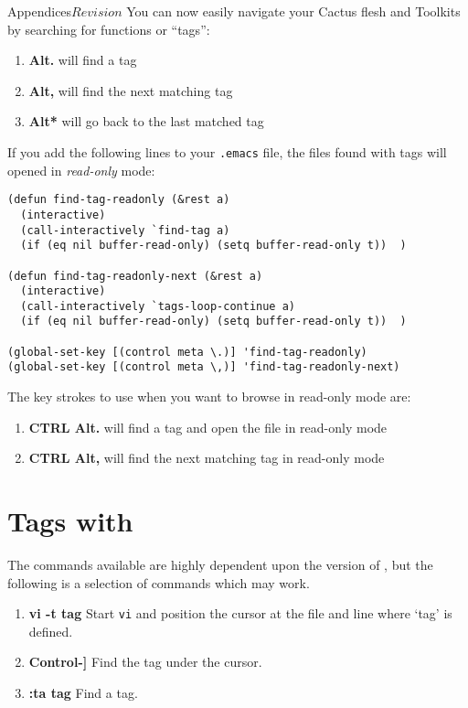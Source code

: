 \begin{cactuspart}{Appendices}{}{$Revision$}
You can now easily navigate your Cactus flesh and Toolkits by searching for
functions or ``tags'':
\begin{enumerate}
\item \textbf{ Alt.} will find a tag
\item \textbf{ Alt,} will find the next matching tag
\item \textbf{ Alt*} will go back to the last matched tag
\end{enumerate}
If you add the following lines to your {\tt .emacs} file, the
files found with tags will opened in \emph{read-only} mode:
\begin{verbatim}
(defun find-tag-readonly (&rest a)
  (interactive)
  (call-interactively `find-tag a)
  (if (eq nil buffer-read-only) (setq buffer-read-only t))  )

(defun find-tag-readonly-next (&rest a)
  (interactive)
  (call-interactively `tags-loop-continue a)
  (if (eq nil buffer-read-only) (setq buffer-read-only t))  )

(global-set-key [(control meta \.)] 'find-tag-readonly)
(global-set-key [(control meta \,)] 'find-tag-readonly-next)
\end{verbatim}
The key strokes to use when you want to browse in read-only mode are:
\begin{enumerate}
\item \textbf{CTRL Alt.} will find a tag and open the file in read-only mode
\item \textbf{CTRL Alt,} will find the next matching tag in read-only mode
\end{enumerate}

\section{Tags with }

The commands available are highly dependent upon the version of , but
the following is a selection of commands which may work.


\begin{enumerate}

\item \textbf{vi -t tag}
Start {\tt vi} and position the cursor at the file and line where `tag' is defined.

\item \textbf{Control-{]}}
Find the tag under the cursor.

\item \textbf{:ta tag}
Find a tag.


\end{enumerate}
\end{cactuspart}
